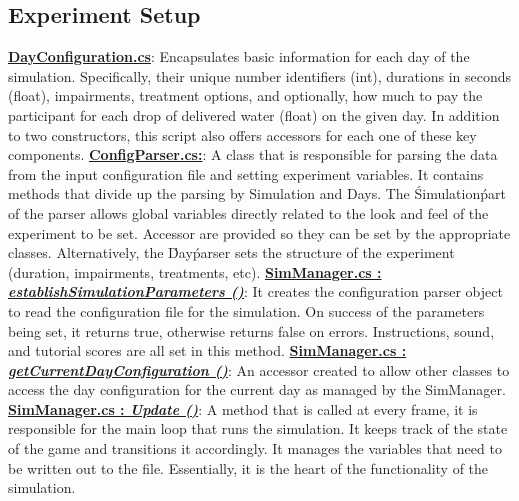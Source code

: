 \documentclass{article}
\begin{document}
\subsection{Experiment Setup} %
\href{https://bit.ly/2FvRTWR}{\textbf{DayConfiguration.cs}}: Encapsulates basic information for each day of the simulation. Specifically, their unique number identifiers (int), durations in seconds (float), impairments, treatment options, and optionally, how much to pay the participant for each drop of delivered water (float) on the given day. In addition to two constructors, this script also offers accessors for each one of these key components. \newline \newline
\href{https://bit.ly/2TZaLYj}{\textbf{ConfigParser.cs:}}: A class that is responsible for parsing the data from the input configuration file and setting experiment variables. It contains methods that divide up the parsing by Simulation and Days. The \'Simulation\' part of the parser allows global variables directly related to the look and feel of the experiment to be set. Accessor are provided so they can be set by the appropriate classes. Alternatively, the \'Day\' parser sets the structure of the experiment (duration, impairments, treatments, etc). 
\newline \newline
\href{https://bit.ly/2UhmSzq}{\textbf{SimManager.cs : \textit{establishSimulationParameters ()}}}: It creates the configuration parser object to read the configuration file for the simulation. On success of the parameters being set, it returns true, otherwise returns false on errors. Instructions, sound, and tutorial scores are all set in this method. \newline \newline
\href{https://bit.ly/2UhmSzq}{\textbf{SimManager.cs : \textit{getCurrentDayConfiguration ()}}}: An accessor created to allow other classes to access the day configuration for the current day as managed by the SimManager. \newline \newline
\href{https://bit.ly/2UhmSzq}{\textbf{SimManager.cs : \textit{Update ()}}}: A method that is called at every frame, it is responsible for the main loop that runs the simulation. It keeps track of the state of the game and transitions it accordingly. It manages the variables that need to be written out to the file. Essentially, it is the heart of the functionality of the simulation.
\end{document}
